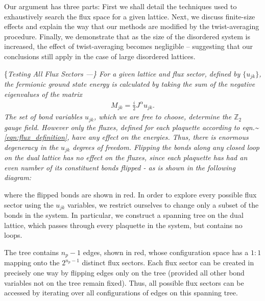 \par

Our argument has three parts: First we shall detail the techniques used
to exhaustively search the flux space for a given lattice. Next, we
discuss finite-size effects and explain the way that our methods are
modified by the twist-averaging procedure. Finally, we demonstrate that
as the size of the disordered system is increased, the effect of
twist-averaging becomes negligible -- suggesting that our conclusions
still apply in the case of large disordered lattices.

\{\it Testing All Flux Sectors ---\} For a given lattice and flux
sector, defined by \(\{ u_{jk}\}\), the fermionic ground state energy is
calculated by taking the sum of the negative eigenvalues of the matrix
\begin{align}
    M_{jk} = \frac{i}{2} J^{\alpha} u_{jk}.
\end{align} The set of bond variables \(u_{jk}\), which we are free to
choose, determine the \(\mathbb Z_2\) gauge field. However only the
fluxes, defined for each plaquette according to
eqn.\textasciitilde{}\ref{eqn:flux_definition}, have any effect on the
energies. Thus, there is enormous degeneracy in the \(u_{jk}\) degrees
of freedom. Flipping the bonds along any closed loop on the dual lattice
has no effect on the fluxes, since each plaquette has had an even number
of its constituent bonds flipped - as is shown in the following diagram:

\begin{center}
    
\end{center}

where the flipped bonds are shown in red. In order to explore every
possible flux sector using the \(u_{jk}\) variables, we restrict
ourselves to change only a subset of the bonds in the system. In
particular, we construct a spanning tree on the dual lattice, which
passes through every plaquette in the system, but contains no loops.

\begin{center}
    
\end{center}

The tree contains \(n_p - 1\) edges, shown in red, whose configuration
space has a \(1:1\) mapping onto the \(2^{n_p - 1}\) distinct flux
sectors. Each flux sector can be created in precisely one way by
flipping edges only on the tree (provided all other bond variables not
on the tree remain fixed). Thus, all possible flux sectors can be
accessed by iterating over all configurations of edges on this spanning
tree.

